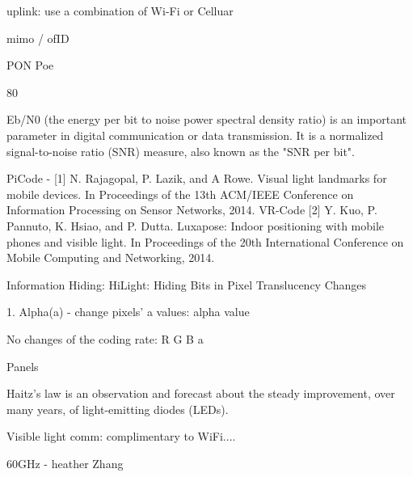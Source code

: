 uplink: use a combination of Wi-Fi or Celluar 

mimo / ofID

PON Poe

80%

Eb/N0 (the energy per bit to noise power spectral density ratio) is an important parameter in digital communication or data transmission. It is a normalized signal-to-noise ratio (SNR) measure, also known as the "SNR per bit".  


PiCode - [1] N. Rajagopal, P. Lazik, and A Rowe. Visual light
landmarks for mobile devices. In Proceedings of the 13th
ACM/IEEE Conference on Information Processing on
Sensor Networks, 2014.
VR-Code [2] Y. Kuo, P. Pannuto, K. Hsiao, and P. Dutta. Luxapose:
Indoor positioning with mobile phones and visible light. In
Proceedings of the 20th International Conference on Mobile
Computing and Networking, 2014.


Information Hiding: 
HiLight: Hiding Bits in Pixel Translucency Changes 

1. Alpha(a) - change pixels' a values: alpha value

No changes of the coding rate: R G B a 


Panels

Haitz's law is an observation and forecast about the steady improvement, over many years, of light-emitting diodes (LEDs).


Visible light comm: complimentary to WiFi....

60GHz - heather Zhang
